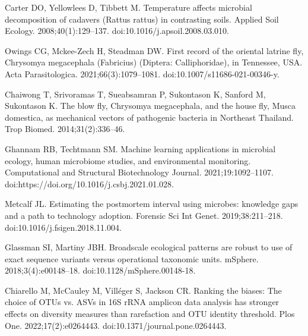 \documentclass[
  10pt,
  letterpaper,
]{article}
\begin{document}
\begin{thebibliography}{10}
  Carter DO, Yellowlees D, Tibbett M.
  \newblock Temperature affects microbial decomposition of cadavers ({Rattus}
    rattus) in contrasting soils.
  \newblock Applied Soil Ecology. 2008;40(1):129--137.
  \newblock doi:{10.1016/j.apsoil.2008.03.010}.
  
  Owings CG, Mckee-Zech H, Steadman DW.
  \newblock First record of the oriental latrine fly, {Chrysomya} megacephala
    ({Fabricius}) ({Diptera}: {Calliphoridae}), in {Tennessee}, {USA}.
  \newblock Acta Parasitologica. 2021;66(3):1079--1081.
  \newblock doi:{10.1007/s11686-021-00346-y}.
  
  Chaiwong T, Srivoramas T, Sueabsamran P, Sukontason K, Sanford M, Sukontason K.
  \newblock The blow fly, {Chrysomya} megacephala, and the house fly, {Musca}
    domestica, as mechanical vectors of pathogenic bacteria in {Northeast}
    {Thailand}.
  \newblock Trop Biomed. 2014;31(2):336--46.
  
  Ghannam RB, Techtmann SM.
  \newblock Machine learning applications in microbial ecology, human microbiome
    studies, and environmental monitoring.
  \newblock Computational and Structural Biotechnology Journal.
    2021;19:1092--1107.
  \newblock doi:{https://doi.org/10.1016/j.csbj.2021.01.028}.
  
  Metcalf JL.
  \newblock Estimating the postmortem interval using microbes: knowledge gaps and
    a path to technology adoption.
  \newblock Forensic Sci Int Genet. 2019;38:211--218.
  \newblock doi:{10.1016/j.fsigen.2018.11.004}.
  
  Glassman SI, Martiny JBH.
  \newblock Broadscale ecological patterns are robust to use of exact sequence
    variants versus operational taxonomic units.
  \newblock mSphere. 2018;3(4):e00148--18.
  \newblock doi:{10.1128/mSphere.00148-18}.
  
  Chiarello M, McCauley M, Villéger S, Jackson CR.
  \newblock Ranking the biases: {The} choice of {OTUs} vs. {ASVs} in {16S} {rRNA}
    amplicon data analysis has stronger effects on diversity measures than
    rarefaction and {OTU} identity threshold.
  \newblock Plos One. 2022;17(2):e0264443.
  \newblock doi:{10.1371/journal.pone.0264443}.
  
  \end{thebibliography}
  
\end{document}
